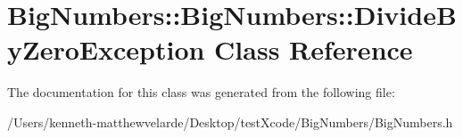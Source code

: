 \hypertarget{class_big_numbers_1_1_big_numbers_1_1_divide_by_zero_exception}{}\section{Big\+Numbers\+::Big\+Numbers\+::Divide\+By\+Zero\+Exception Class Reference}
\label{class_big_numbers_1_1_big_numbers_1_1_divide_by_zero_exception}


The documentation for this class was generated from the following file\+:\begin{DoxyCompactItemize}
\item 
/\+Users/kenneth-\/matthewvelarde/\+Desktop/test\+Xcode/\+Big\+Numbers/Big\+Numbers.\+h\end{DoxyCompactItemize}
